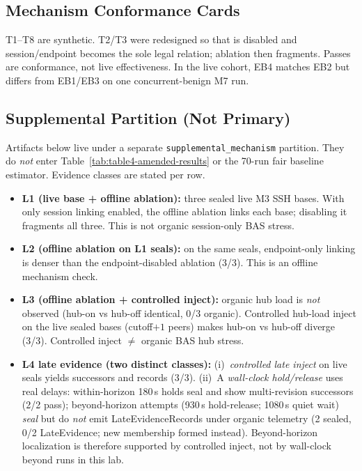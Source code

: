 \subsection{Mechanism Conformance Cards}
\label{sec:mechanism}



T1--T8 are synthetic. T2/T3 were redesigned so that  is disabled and
session/endpoint becomes the sole legal relation; ablation then fragments. Passes are
conformance, not live effectiveness. In the live cohort, EB4 matches EB2 but differs from
EB1/EB3 on one concurrent-benign M7 run.

\subsection{Supplemental Partition (Not Primary)}
\label{sec:supplemental-live}

Artifacts below live under a separate \texttt{supplemental\_mechanism} partition. They do
\emph{not} enter Table~\ref{tab:table4-amended-results} or the 70-run fair
baseline estimator. Evidence classes are stated per row.

\begin{itemize}
  \item \textbf{L1 (live base + offline ablation):} three sealed live M3 SSH bases. With only
        session linking enabled, the offline ablation links each base; disabling it fragments all
        three. This is not organic session-only BAS stress.
  \item \textbf{L2 (offline ablation on L1 seals):} on the same seals, endpoint-only linking is
        denser than the endpoint-disabled ablation (3/3). This is an offline mechanism check.
  \item \textbf{L3 (offline ablation + controlled inject):} organic hub load is \emph{not}
        observed (hub-on vs hub-off identical, 0/3 organic). Controlled hub-load inject on the
        live sealed bases (cutoff$+1$ peers) makes hub-on vs hub-off diverge (3/3). Controlled
        inject $\neq$ organic BAS hub stress.
  \item \textbf{L4 late evidence (two distinct classes):}
        (i)~\emph{controlled late inject} on live seals yields successors and
         records (3/3).
        (ii)~A \emph{wall-clock hold/release} uses real delays: within-horizon 180\,s holds
        seal and show multi-revision successors (2/2 pass); beyond-horizon attempts
        (930\,s hold-release; 1080\,s quiet wait) \emph{seal} but do \emph{not} emit
        LateEvidenceRecords under organic telemetry (2 sealed, 0/2 LateEvidence; new membership
        formed instead). Beyond-horizon localization is therefore supported by controlled inject,
        not by wall-clock beyond runs in this lab.
\end{itemize}

